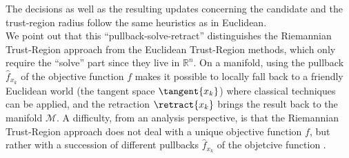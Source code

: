 The decisions as well as the resulting updates concerning the candidate and the trust-region radius follow the same heuristics as in Euclidean. \\ %
We point out that this “pullback-solve-retract” distinguishes the Riemannian Trust-Region approach from the Euclidean Trust-Region methods, which only require the “solve” part since they live in $\mathbb{R}^n$. On a manifold, using the pullback $\hat{f}_{x_k}$ of the objective function $f$ makes it possible to locally fall back to a friendly Euclidean world (the tangent space $\tangent{x_k}$) where classical techniques can be applied, and the retraction $\retract{x_k}$ brings the result back to the manifold $\mathcal{M}$. A difficulty, from an analysis perspective, is that the Riemannian Trust-Region approach does not deal with a unique objective function $f$,
but rather with a succession of different pullbacks $\hat{f}_{x_k}$ of the objetcive function \cite[p.~305]{AbsilBakerGallivan:2007}. \\

